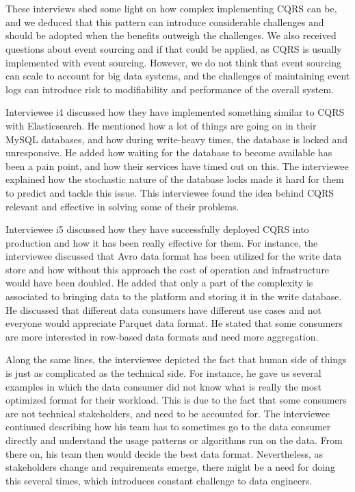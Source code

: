\documentclass{bmcart}
\begin{document}
\,

\setlength{\fboxsep}{0.7em}
\noindent{}

\,


These interviews shed some light on how complex implementing CQRS can be, and we deduced that this pattern can introduce considerable challenges and should be adopted when the benefits outweigh the challenges. We also received questions about event sourcing and if that could be applied, as CQRS is usually implemented with event sourcing. However, we do not think that event sourcing can scale to account for big data systems, and the challenges of maintaining event logs can introduce risk to modifiability and performance of the overall system. 


Interviewee i4 discussed how they have implemented something similar to CQRS with Elasticsearch. He mentioned how a lot of things are going on in their MySQL databases, and how during write-heavy times, the database is locked and unresponsive. He added how waiting for the database to become available has been a pain point, and how their services have timed out on this. The interviewee explained how the stochastic nature of the database locks made it hard for them to predict and tackle this issue. This interviewee found the idea behind CQRS relevant and effective in solving some of their problems. 

Interviewee i5 discussed how they have successfully deployed CQRS into production and how it has been really effective for them. For instance, the interviewee discussed that Avro data format has been utilized for the write data store and how without this approach the cost of operation and infrastructure would have been doubled. He added that only a part of the complexity is associated to bringing data to the platform and storing it in the write database. He discussed that different data consumers have different use cases and not everyone would appreciate Parquet data format. He stated that some consumers are more interested in row-based data formats and need more aggregation. 

Along the same lines, the interviewee depicted the fact that human side of things is just as complicated as the technical side. For instance, he gave us several examples in which the data consumer did not know what is really the most optimized format for their workload. This is due to the fact that some consumers are not technical stakeholders, and need to be accounted for. The interviewee continued describing how his team has to sometimes go to the data consumer directly and understand the usage patterns or algorithms run on the data. From there on, his team then would decide the best data format. Nevertheless, as stakeholders change and requirements emerge, there might be a need for doing this several times, which introduces constant challenge to data engineers.
\end{document}

